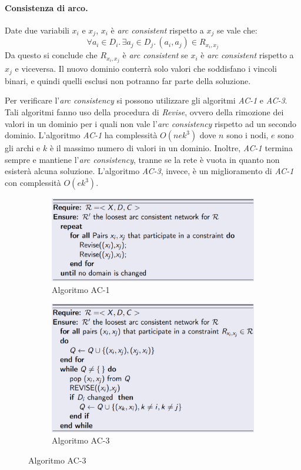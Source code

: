 \documentclass[11pt,oneside]{book}
\begin{document}
\paragraph{Consistenza di arco.}
Date due variabili $x_i$ e $x_j$, $x_i$ è \textit{arc consistent} rispetto a $x_j$ se vale che:
\[ \forall a_i \in D_i. \, \exists a_j \in D_j. \, (a_i, a_j) \in R_{x_i, x_j} \]
Da questo si conclude che $R_{x_i, x_j}$ è \textit{arc consistent} se $x_i$ è \textit{arc consistent} rispetto a $x_j$ e viceversa. Il nuovo dominio conterrà solo valori che soddisfano i vincoli binari, e quindi quelli esclusi non potranno far parte della soluzione.

Per verificare l'\textit{arc consistency} si possono utilizzare gli algoritmi \textit{AC-1} e \textit{AC-3}. Tali algoritmi fanno uso della procedura di \textit{Revise}, ovvero della rimozione dei valori in un dominio per i quali non vale l'\textit{arc consistency} rispetto ad un secondo dominio. L'algoritmo \textit{AC-1} ha complessità $O(nek^3)$ dove $n$ sono i nodi, $e$ sono gli archi e $k$ è il massimo numero di valori in un dominio.  Inoltre, \textit{AC-1} termina sempre e mantiene l'\textit{arc consistency}, tranne se la rete è vuota in quanto non esisterà alcuna soluzione. L'algoritmo \textit{AC-3}, invece, è un miglioramento di \textit{AC-1} con complessità $O(ek^3)$.
\begin{figure}[htp]
	\begin{subfigure}{0.49\textwidth}
	    \centering
		\includegraphics[width=\textwidth, height=\textheight, keepaspectratio]{ac-1.png}
		\caption{Algoritmo AC-1}
	\end{subfigure}
	\hfill
	\begin{subfigure}{0.49\textwidth}
	    \centering
		\includegraphics[width=\textwidth, height=\textheight, keepaspectratio]{ac-3.png}
		\caption{Algoritmo AC-3}
	\end{subfigure}
\end{figure}
\end{document}
